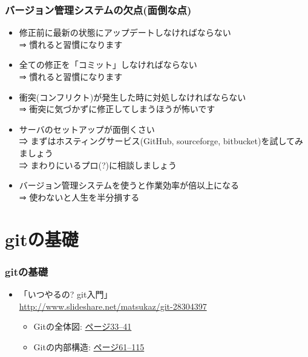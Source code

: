 \begin{frame}
  \frametitle{バージョン管理システムの欠点(面倒な点)}
  \begin{itemize}
  \item 修正前に最新の状態にアップデートしなければならない \\
   ⇒ 慣れると習慣になります
  \item 全ての修正を「コミット」しなければならない \\
    ⇒ 慣れると習慣になります
  \item 衝突(コンフリクト)が発生した時に対処しなければならない \\
    ⇒ 衝突に気づかずに修正してしまうほうが怖いです
  \item サーバのセットアップが面倒くさい \\
    ⇒ まずはホスティングサービス(GitHub, sourceforge, bitbucket)を試してみましょう \\
    ⇒ まわりにいるプロ(?)に相談しましょう \\[.5em]
  \item バージョン管理システムを使うと作業効率が倍以上になる \\
    ⇒ {\color{red} 使わないと人生を半分損する}
  \end{itemize}
\end{frame}

\section{gitの基礎}

\begin{frame}
  \frametitle{gitの基礎}
  \begin{itemize}
  \item 「いつやるの? git入門」\\ \url{http://www.slideshare.net/matsukaz/git-28304397}
    \begin{itemize}
    \item Gitの全体図: \href{http://www.slideshare.net/matsukaz/git-28304397/33}{ページ33--41}      
    \item Gitの内部構造:  \href{http://www.slideshare.net/matsukaz/git-28304397/61}{ページ61--115}
    \end{itemize}
  \end{itemize}
\end{frame}

